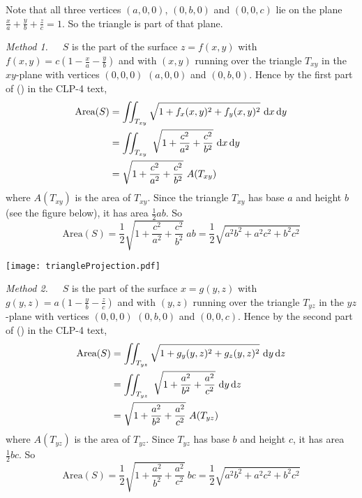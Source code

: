 \begin{solution}
Note that all three vertices $(a,0,0)$, $(0,b,0)$ and $(0,0,c)$ lie on 
the plane $\frac{x}{a}+\frac{y}{b} +\frac{z}{c}=1$. So the triangle is 
part of that plane.

\emph{Method 1.}\ \ \ 
 $S$ is the part of the surface $z=f(x,y)$ with 
$f(x,y) = c\left(1-\frac{x}{a}-\frac{y}{b}\right)$
and with $(x,y)$ running over the triangle $T_{xy}$ in the $xy$-plane 
with vertices $(0,0,0)$ $(a,0,0)$ and $(0,b,0)$.
Hence by the first part of () in the CLP-4 text,
\begin{align*}
\text{Area}(S)&=\dblInt_{T_{xy}} \sqrt{1+f_x(x,y)^2+f_y(x,y)^2}\ \dee{x}\,\dee{y} \\
&=\dblInt_{T_{xy}}\ \sqrt{1+\frac{c^2}{a^2}+\frac{c^2}{b^2}}\  
\dee{x}\,\dee{y} \\
&=\sqrt{1+\frac{c^2}{a^2}+\frac{c^2}{b^2}}\ A(T_{xy})
\end{align*}
where $A(T_{xy})$ is the area of $T_{xy}$. Since the triangle $T_{xy}$ 
has base $a$ and height $b$ (see the figure below), it has 
area $\frac{1}{2}ab$. So
\begin{equation*}
\text{Area}(S)=\frac{1}{2}\sqrt{1+\frac{c^2}{a^2}+\frac{c^2}{b^2}}\ ab 
 =\frac{1}{2}\sqrt{a^2b^2+a^2c^2+b^2c^2}
\end{equation*}

\begin{center}
     \texttt{[image: triangleProjection.pdf]}
\end{center}


\emph{Method 2.}\ \ \ 
 $S$ is the part of the surface $x=g(y,z)$ with 
$g(y,z) = a\left(1-\frac{y}{b}-\frac{z}{c}\right)$
and with $(y,z)$ running over the triangle $T_{yz}$ in the $yz$-plane 
with vertices $(0,0,0)$ $(0,b,0)$ and $(0,0,c)$.
Hence by the second part of () in the CLP-4 text,
\begin{align*}
\text{Area}(S)&=\dblInt_{T_{yz}} \sqrt{1+g_y(y,z)^2+g_z(y,z)^2}\ \dee{y}\,\dee{z} \\
&=\dblInt_{T_{yz}}\ \sqrt{1+\frac{a^2}{b^2}+\frac{a^2}{c^2}}\  
\dee{y}\,\dee{z}\\
&=\sqrt{1+\frac{a^2}{b^2}+\frac{a^2}{c^2}}\ A(T_{yz})
\end{align*}
where $A(T_{yz})$ is the area of $T_{yz}$. Since $T_{yz}$ has base $b$ and 
height $c$, it has area $\frac{1}{2}bc$. So
\begin{equation*}
\text{Area}(S)=\frac{1}{2}\sqrt{1+\frac{a^2}{b^2}+\frac{a^2}{c^2}}\ bc 
 =\frac{1}{2}\sqrt{a^2b^2+a^2c^2+b^2c^2}
\end{equation*}


\end{solution}
